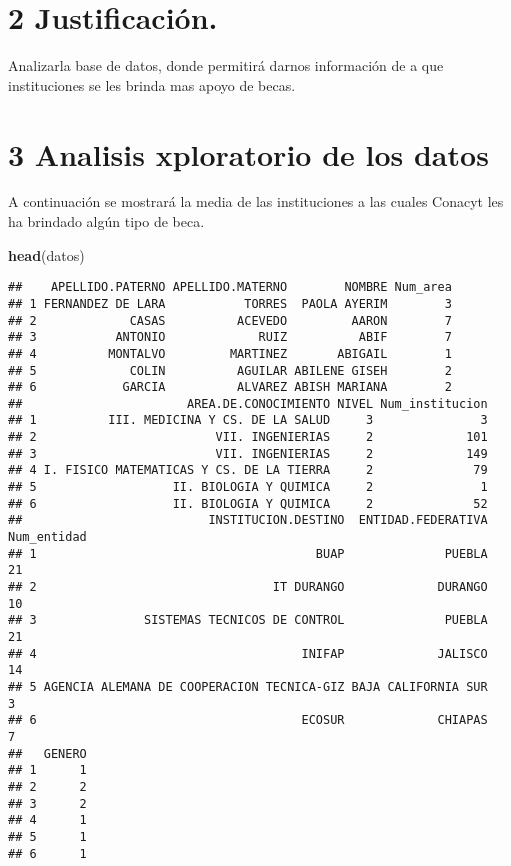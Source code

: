 \documentclass[
]{article}
\newenvironment{Shaded}{\begin{snugshade}}{\end{snugshade}}
\newcommand{\FunctionTok}[1]{\textcolor[rgb]{0.13,0.29,0.53}{\textbf{#1}}}
\newcommand{\NormalTok}[1]{#1}
\begin{document}
\hypertarget{justificaciuxf3n.}{%
\section{2 Justificación.}\label{justificaciuxf3n.}}

Analizarla base de datos, donde permitirá darnos información de a que
instituciones se les brinda mas apoyo de becas.

\hypertarget{analisis-xploratorio-de-los-datos}{%
\section{3 Analisis xploratorio de los
datos}\label{analisis-xploratorio-de-los-datos}}

A continuación se mostrará la media de las instituciones a las cuales
Conacyt les ha brindado algún tipo de beca.

\begin{Shaded}
\begin{Highlighting}[]
\FunctionTok{head}\NormalTok{(datos)}
\end{Highlighting}
\end{Shaded}

\begin{verbatim}
##    APELLIDO.PATERNO APELLIDO.MATERNO        NOMBRE Num_area
## 1 FERNANDEZ DE LARA           TORRES  PAOLA AYERIM        3
## 2             CASAS          ACEVEDO         AARON        7
## 3           ANTONIO             RUIZ          ABIF        7
## 4          MONTALVO         MARTINEZ       ABIGAIL        1
## 5             COLIN          AGUILAR ABILENE GISEH        2
## 6            GARCIA          ALVAREZ ABISH MARIANA        2
##                       AREA.DE.CONOCIMIENTO NIVEL Num_institucion
## 1          III. MEDICINA Y CS. DE LA SALUD     3               3
## 2                         VII. INGENIERIAS     2             101
## 3                         VII. INGENIERIAS     2             149
## 4 I. FISICO MATEMATICAS Y CS. DE LA TIERRA     2              79
## 5                   II. BIOLOGIA Y QUIMICA     2               1
## 6                   II. BIOLOGIA Y QUIMICA     2              52
##                          INSTITUCION.DESTINO  ENTIDAD.FEDERATIVA Num_entidad
## 1                                       BUAP              PUEBLA          21
## 2                                 IT DURANGO             DURANGO          10
## 3               SISTEMAS TECNICOS DE CONTROL              PUEBLA          21
## 4                                     INIFAP             JALISCO          14
## 5 AGENCIA ALEMANA DE COOPERACION TECNICA-GIZ BAJA CALIFORNIA SUR           3
## 6                                     ECOSUR             CHIAPAS           7
##   GENERO
## 1      1
## 2      2
## 3      2
## 4      1
## 5      1
## 6      1
\end{verbatim}
\end{document}
